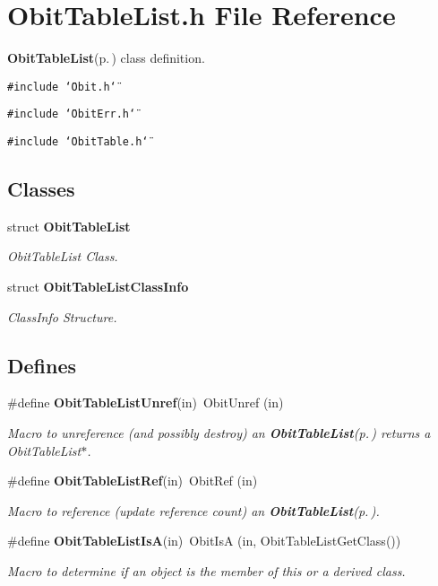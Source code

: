 \section{Obit\-Table\-List.h File Reference}
\label{ObitTableList_8h}
{\bf Obit\-Table\-List}{\rm (p.\,\pageref{structObitTableList})} class definition. 

{\tt \#include \char`\"{}Obit.h\char`\"{}}\par
{\tt \#include \char`\"{}Obit\-Err.h\char`\"{}}\par
{\tt \#include \char`\"{}Obit\-Table.h\char`\"{}}\par
\subsection*{Classes}
\begin{CompactItemize}
\item 
struct {\bf Obit\-Table\-List}
\begin{CompactList}\small\item\em Obit\-Table\-List Class. \item\end{CompactList}\item 
struct {\bf Obit\-Table\-List\-Class\-Info}
\begin{CompactList}\small\item\em Class\-Info Structure. \item\end{CompactList}\end{CompactItemize}
\subsection*{Defines}
\begin{CompactItemize}
\item 
\#define {\bf Obit\-Table\-List\-Unref}(in)\ Obit\-Unref (in)
\begin{CompactList}\small\item\em Macro to unreference (and possibly destroy) an {\bf Obit\-Table\-List}{\rm (p.\,\pageref{structObitTableList})} returns a Obit\-Table\-List$\ast$. \item\end{CompactList}\item 
\#define {\bf Obit\-Table\-List\-Ref}(in)\ Obit\-Ref (in)
\begin{CompactList}\small\item\em Macro to reference (update reference count) an {\bf Obit\-Table\-List}{\rm (p.\,\pageref{structObitTableList})}. \item\end{CompactList}\item 
\#define {\bf Obit\-Table\-List\-Is\-A}(in)\ Obit\-Is\-A (in, Obit\-Table\-List\-Get\-Class())
\begin{CompactList}\small\item\em Macro to determine if an object is the member of this or a derived class. \item\end{CompactList}\end{CompactItemize}
